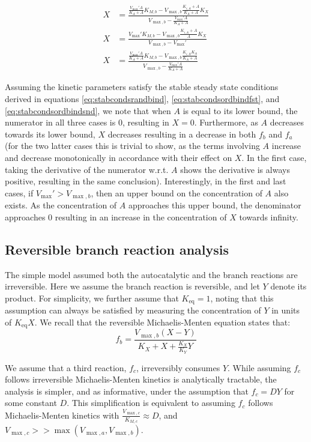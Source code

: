  \begin{align}
      X &= \frac{\frac{V_{\max}'A}{K_A+A}K_{M,b}-V_{\max,b}\frac{K_{i,A}+A}{K_A+A}K_X}
      {V_{\max,b}-\frac{V_{\max}'A}{K_A+A}} \label{eq:xststrand} \\
      X &= \frac{V_{\max}'K_{M,b}-V_{\max,b}\frac{K_{i,A}+A}{A}K_X}
      {V_{\max,b}-V_{\max}'}\label{eq:xststordfst} \\
      X &= \frac{\frac{V_{\max}'A}{K_A+A}K_{M,b}-V_{\max,b}\frac{K_{i,X}K_A}{K_A+A} }
      { V_{\max,b}-\frac{V_{\max}'A}{K_A+A} }\label{eq:xststordsnd}
  \end{align}

  Assuming the kinetic parameters satisfy the stable steady state conditions derived in equations \ref{eq:stabcondsrandbind}, \ref{eq:stabcondsordbindfst}, and \ref{eq:stabcondsordbindsnd}, we note that when $A$ is equal to its lower bound, the numerator in all three cases is $0$, resulting in $X=0$.
  Furthermore, as $A$ decreases towards its lower bound, $X$ decreases resulting in a decrease in both $f_b$ and $f_a$ (for the two latter cases this is trivial to show, as the terms involving $A$ increase and decrease monotonically in accordance with their effect on $X$. In the first case, taking the derivative of the numerator w.r.t. $A$ shows the derivative is always positive, resulting in the same conclusion).
  Interestingly, in the first and last cases, if $V_{\max}'>V_{\max,b}$, then an upper bound on the concentration of $A$ also exists.
  As the concentration of $A$ approaches this upper bound, the denominator approaches $0$ resulting in an increase in the concentration of $X$ towards infinity.

\subsection{Reversible branch reaction analysis}
    The simple model assumed both the autocatalytic and the branch reactions are irreversible.
    Here we assume the branch reaction is reversible, and let $Y$ denote its product.
    For simplicity, we further assume that $K_{\text{eq}}=1$, noting that this assumption can always be satisfied by measuring the concentration of $Y$ in units of $K_{\text{eq}}X$.
    We recall that the reversible Michaelis-Menten equation states that:
   \begin{equation*}
       f_b=\frac{V_{\max,b}(X-Y)}{K_X+X+\frac{K_X}{K_Y}Y}
   \end{equation*}

   We assume that a third reaction, $f_c$, irreversibly consumes $Y$.
   While assuming $f_c$ follows irreversible Michaelis-Menten kinetics is analytically tractable, the analysis is simpler, and as informative, under the assumption that $f_c=DY$ for some constant $D$.
   This simplification is equivalent to assuming $f_c$ follows Michaelis-Menten kinetics with $\frac{V_{\max,c}}{K_{M,c}} \approx D$, and $V_{\max,c} >> \max(V_{\max,a},V_{\max,b})$.

